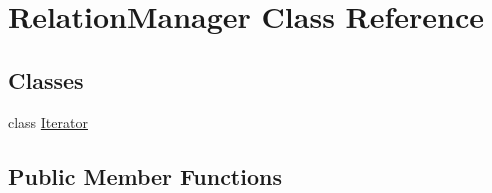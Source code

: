 \hypertarget{class_relation_manager}{}\section{Relation\+Manager Class Reference}
\label{class_relation_manager}
\subsection*{Classes}
\begin{DoxyCompactItemize}
\item 
class \hyperlink{class_relation_manager_1_1_iterator}{Iterator}
\end{DoxyCompactItemize}
\subsection*{Public Member Functions}
